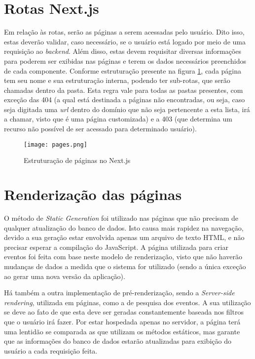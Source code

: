 \section{Rotas Next.js}
Em relação às rotas, serão as páginas a serem acessadas pelo usuário. Dito isso, estas deverão validar, caso necessário, se o usuário está logado por meio de uma requisição ao \textit{backend}. Além disso, estas devem requisitar diversas informações para poderem ser exibidas nas páginas e terem os dados necessários preenchidos de cada componente. Conforme estruturação presente na figura \ref{pages}, cada página tem seu nome e sua estruturação interna, podendo ter sub-rotas, que serão chamadas dentro da pasta. Esta regra vale para todas as pastas presentes, com exceção das 404 (a qual está destinada a páginas não encontradas, ou seja, caso seja digitada uma \textit{url} dentro do domínio que não seja pertencente a esta lista, irá a chamar, visto que é uma página customizada) e a 403 (que determina um recurso não possível de ser acessado para determinado usuário).
\begin{figure}[H]
    \caption{\label{pages}Estruturação de páginas no Next.js}
    \vspace{5pt}
    \centering
    \texttt{[image: pages.png]}
    \vspace{5pt}
\end{figure}

\section{Renderização das páginas}
O método de \textit{Static Generation} foi utilizado nas páginas que não precisam de qualquer atualização do banco de dados. Isto causa mais rapidez na navegação, devido a sua geração estar envolvida apenas um arquivo de texto HTML, e não precisar esperar a compilação do JavaScript. A página utilizada para criar eventos foi feita com base neste modelo de renderização, visto que não haverão mudanças de dados a medida que o sistema for utilizado (sendo a única exceção ao gerar uma nova versão da aplicação).

Há também a outra implementação de pré-renderização, sendo a \textit{Server-side rendering}, utilizada em páginas, como a de pesquisa dos eventos. A sua utilização se deve ao fato de que esta deve ser geradas constantemente baseada nos filtros que o usuário irá fazer. Por estar hospedada apenas no servidor, a página terá uma lentidão se comparada as que utilizam os métodos estáticos, mas garante que as informações do banco de dados estarão atualizadas para exibição do usuário a cada requisição feita.

